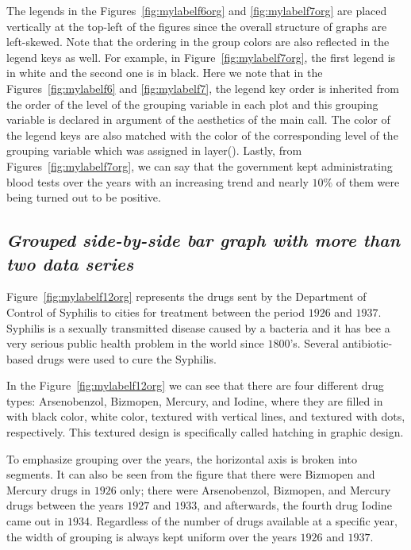 The legends in the Figures~\ref{fig:mylabelf6org} and \ref{fig:mylabelf7org} are placed vertically at the top-left of the figures since the overall structure of graphs are left-skewed. 
Note that the ordering in the group colors are also reflected in the legend keys as well. For example, in Figure~\ref{fig:mylabelf7org}, the first legend is in white and the second one is in black. Here we note that in the Figures~\ref{fig:mylabelf6} and \ref{fig:mylabelf7}, the legend key order is inherited from the order of the level of the grouping variable in each plot and this grouping variable is declared in  argument of the aesthetics of the main  call. The color of the legend keys are also matched with the color of the corresponding level of the grouping variable which was assigned in  layer(). Lastly, from Figures~\ref{fig:mylabelf7org}, we can say that the government kept administrating blood tests over the years with an increasing trend and nearly $10\%$ of them were being turned out to be positive. 


\subsection{\textit{Grouped side-by-side bar graph with more than two data series}}

Figure~\ref{fig:mylabelf12org} represents the drugs sent by the Department of Control of Syphilis to cities for treatment between the period $1926$ and $1937$. Syphilis is a sexually transmitted disease caused by a bacteria and it has bee a very serious public health problem in the world since $1800$'s. Several antibiotic-based drugs were used to cure the Syphilis.

In the Figure~\ref{fig:mylabelf12org} we can see that there are four different drug types: Arsenobenzol, Bizmopen, Mercury, and Iodine, where they are filled in with black color, white color, textured with vertical lines, and textured with dots, respectively. This textured design is specifically called hatching in graphic design. 

To emphasize grouping over the years, the horizontal axis is broken into segments. It can also be seen from the figure that there were Bizmopen and Mercury drugs in $1926$ only; there were Arsenobenzol, Bizmopen, and Mercury drugs between the years $1927$ and $1933$, and afterwards, the fourth drug Iodine came out in $1934$. Regardless of the number of drugs available at a specific year, the width of grouping is always kept uniform over the years $1926$ and $1937$. 

